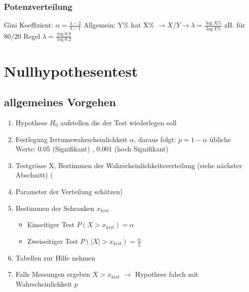 \documentclass[margin=normal]{tex/hsrzf}
\begin{document}
\subsubsection{Potenzverteilung}
Gini Koeffizient: $\alpha = \frac{\lambda -2}{\lambda -1}$
\newline Allgemein: Y\% hat X\%  $ \rightarrow X / Y \rightarrow \lambda = \frac{\log{X\%}}{\log{Y\%}}$
\newline zB. für 80/20 Regel $\lambda = \frac{\log{0.8}}{\log{0.2}}$

\newpage
\section{Nullhypothesentest}

\begin{minipage}{0.49\textwidth}
    \subsection{allgemeines Vorgehen}
    \begin{enumerate}
        \item Hypothese $H_0$ aufstellen die der Test
              \newline wiederlegen soll
        \item Festlegung Irrtumswahrscheinlichkeit $\alpha$,
              \newline daraus folgt: $p = 1-\alpha$
              \newline übliche Werte: 0.05 (Signifikant)
              , 0.001 (hoch Signifikant)
        \item Testgrösse X, Bestimmen der Wahrscheinlichkeitsverteilung (siehe nächster Abschnitt)
              (\item Parameter der Verteilung schätzen)
        \item Bestimmen der Schranken $x_{krit}$
              \begin{itemize}
                  \item Einseitiger Test $P(X> x_{krit})= \alpha$
                  \item Zweiseitiger Test $P(|X| > x_{krit}) = \frac{\alpha}{2}$
              \end{itemize}
        \item Tabellen zur Hilfe nehmen
        \item Falls Messungen ergeben $X > x_{krit}$
              \newline $\rightarrow$ Hypothese falsch mit Wahrscheinlichkeit $p$
    \end{enumerate}
\end{minipage}%
\end{document}
